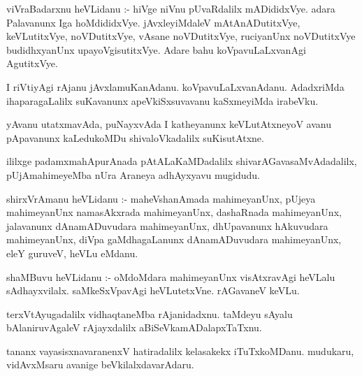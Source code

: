 \documentclass{article}
\begin{document}
\begin{mn}
viVraBadarxnu  heVLidanu :- hiVge  niVnu  pUvaRdalilx  mADididxVye.  adara  Palavanunx  Iga  hoMdididxVye.  
jAvxleyiMdaleV  mAtAnADutitxVye,  keVLutitxVye,  noVDutitxVye,  vAsane  noVDutitxVye,  ruciyanUnx  noVDutitxVye  
budidhxyanUnx  upayoVgisutitxVye.  Adare  bahu  koVpavuLaLxvanAgi  AgutitxVye.
\end{mn}

\begin{mn}
I  riVtiyAgi  rAjanu  jAvxlamuKanAdanu.  koVpavuLaLxvanAdanu.  AdadxriMda  ihaparagaLalilx  suKavanunx  
apeVkiSxsuvavanu  kaSxmeyiMda  irabeVku.
\end{mn}

\begin{mn}
yAvanu  utatxmavAda,  puNayxvAda  I  katheyanunx  keVLutAtxneyoV  avanu  pApavanunx  kaLedukoMDu  
shivaloVkadalilx  suKisutAtxne.
\end{mn}

\begin{mn}
ililxge  padamxmahApurAnada  pAtALaKaMDadalilx  shivarAGavasaMvAdadalilx,  pUjAmahimeyeMba  nUra  
Araneya  adhAyxyavu  mugidudu.
\end{mn}




\begin{mn}
shirxVrAmanu  heVLidanu :- maheVshanAmada  mahimeyanUnx,  pUjeya  mahimeyanUnx  namasAkxrada  
mahimeyanUnx,  dashaRnada  mahimeyanUnx,  jalavanunx  dAnamADuvudara  mahimeyanUnx,  dhUpavanunx  
hAkuvudara  mahimeyanUnx,  diVpa gaMdhagaLanunx  dAnamADuvudara  mahimeyanUnx,  eleY  guruveV,  heVLu  eMdanu.
\end{mn}

\begin{mn}
shaMBuvu  heVLidanu :- oMdoMdara  mahimeyanUnx  visAtxravAgi  heVLalu  sAdhayxvilalx.  saMkeSxVpavAgi  
heVLutetxVne.  rAGavaneV  keVLu.
\end{mn}

\begin{mn}
terxVtAyugadalilx  vidhaqtaneMba  rAjanidadxnu.  taMdeyu  sAyalu  bAlaniruvAgaleV  rAjayxdalilx  aBiSeVkamADalapxTaTxnu.
\end{mn}

\begin{mn}
tananx  vayasisxnavaranenxV  hatiradalilx  kelasakekx  iTuTxkoMDanu.  mudukaru,  vidAvxMsaru  avanige  beVkilalxdavarAdaru.
\end{mn}
\end{document}
